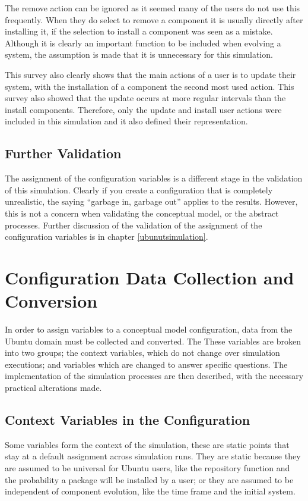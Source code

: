 The remove action can be ignored as it seemed many of the users do not use this frequently.
When they do select to remove a component it is usually directly after installing it, if the selection to install a component was seen as a mistake.
Although it is clearly an important function to be included when evolving a system, the assumption is made that it is unnecessary for this simulation.

This survey also clearly shows that the main actions of a user is to update their system,
with the installation of a component the second most used action.
This survey also showed that the update occurs at more regular intervals than the install components.
Therefore, only the update and install user actions were included in this simulation and it also defined their representation. 


\subsection{Further Validation}
The assignment of the configuration variables is a different stage in the validation of this simulation.
Clearly if you create a configuration that is completely unrealistic, the saying ``garbage in, garbage out'' applies to the results.
However, this is not a concern when validating the conceptual model, or the abstract processes.
Further discussion of the validation of the assignment of the configuration variables is in chapter \ref{ubunutsimulation}.


\section{Configuration Data Collection and Conversion}
In order to assign variables to a conceptual model configuration, data from the Ubuntu domain must be collected and converted.
The 
These variables are broken into two groups; the context variables, which do not change over simulation executions; 
and variables which are changed to answer specific questions.
The implementation of the simulation processes are then described, with the necessary practical alterations made. 

\subsection{Context Variables in the Configuration}
Some variables form the context of the simulation, these are static points that stay at a default assignment across simulation runs.
They are static because they are assumed to be universal for Ubuntu users, like the repository function and the probability a package will be installed by a user;
or they are assumed to be independent of component evolution, like the time frame and the initial system.

